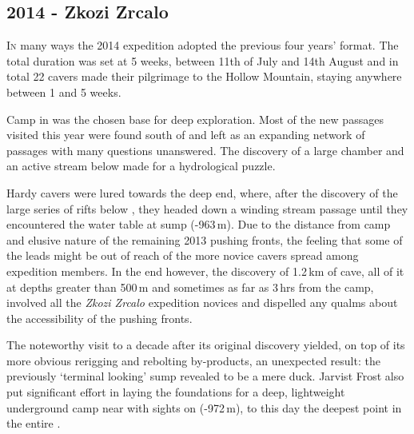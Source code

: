\newpage
\begin{tcolorbox}

\chapter{2014 - Zkozi Zrcalo}
		\lettrine{I}{n} many ways the 2014 expedition adopted the previous four years' format. The total duration was set at 5 weeks, between 11th of July and 14th August and in total 22 cavers made their pilgrimage to the Hollow Mountain, staying anywhere between 1 and 5 weeks.

Camp  in  was the chosen base for deep exploration. Most of the new passages visited this year were found south of  and left as an expanding network of passages with many questions unanswered. The discovery of a large chamber and an active stream below made for a hydrological puzzle.

		Hardy cavers were lured towards the deep end, where, after the discovery of the large series of rifts below , they headed down a winding stream passage until they encountered the water table at  sump (-963\,m).  Due to the distance from camp and elusive nature of the remaining 2013 pushing fronts, the feeling that some of the leads might be out of reach of the more novice cavers spread among expedition members. In the end however, the discovery of 1.2\,km of cave, all of it at depths greater than 500\,m and sometimes as far as 3\,hrs from the camp, involved all the \emph{Zkozi Zrcalo} expedition novices and dispelled any qualms about the accessibility of the pushing fronts.

 		The noteworthy visit to  a decade after its original discovery yielded, on top of its more obvious rerigging and rebolting by-products, an unexpected result: the previously `terminal looking' sump revealed to be a mere duck. Jarvist Frost also put significant effort in laying the foundations for a deep, lightweight underground camp near  with sights on  (-972\,m), to this day the deepest point in the entire .
		
\end{tcolorbox}
